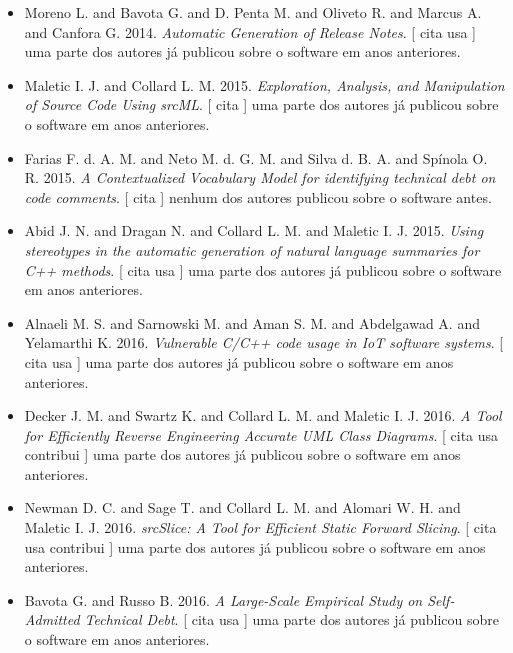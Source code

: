 \begin{itemize}
      [
          cita
          usa
      ]
nenhum dos autores publicou sobre o software antes.
\item Moreno L. and Bavota G. and D. Penta M. and Oliveto R. and Marcus A. and Canfora G.
      2014.
        \textit{ Automatic Generation of Release Notes}.
      [
          cita
          usa
      ]
uma parte dos autores já publicou sobre o software em anos anteriores.
\item Maletic I. J. and Collard L. M.
      2015.
        \textit{ Exploration, Analysis, and Manipulation of Source Code Using srcML}.
      [
          cita
      ]
uma parte dos autores já publicou sobre o software em anos anteriores.
\item Farias F. d. A. M. and Neto M. d. G. M. and Silva d. B. A. and Spínola O. R.
      2015.
        \textit{ A Contextualized Vocabulary Model for identifying technical debt on code comments}.
      [
          cita
      ]
nenhum dos autores publicou sobre o software antes.
\item Abid J. N. and Dragan N. and Collard L. M. and Maletic I. J.
      2015.
        \textit{ Using stereotypes in the automatic generation of natural language summaries for C++ methods}.
      [
          cita
          usa
      ]
uma parte dos autores já publicou sobre o software em anos anteriores.
\item Alnaeli M. S. and Sarnowski M. and Aman S. M. and Abdelgawad A. and Yelamarthi K.
      2016.
        \textit{ Vulnerable C/C++ code usage in IoT software systems}.
      [
          cita
          usa
      ]
uma parte dos autores já publicou sobre o software em anos anteriores.
\item Decker J. M. and Swartz K. and Collard L. M. and Maletic I. J.
      2016.
        \textit{ A Tool for Efficiently Reverse Engineering Accurate UML Class Diagrams}.
      [
          cita
          usa
          contribui
      ]
uma parte dos autores já publicou sobre o software em anos anteriores.
\item Newman D. C. and Sage T. and Collard L. M. and Alomari W. H. and Maletic I. J.
      2016.
        \textit{ srcSlice: A Tool for Efficient Static Forward Slicing}.
      [
          cita
          usa
          contribui
      ]
uma parte dos autores já publicou sobre o software em anos anteriores.
\item Bavota G. and Russo B.
      2016.
        \textit{ A Large-Scale Empirical Study on Self-Admitted Technical Debt}.
      [
          cita
          usa
      ]
uma parte dos autores já publicou sobre o software em anos anteriores.

\end{itemize}

